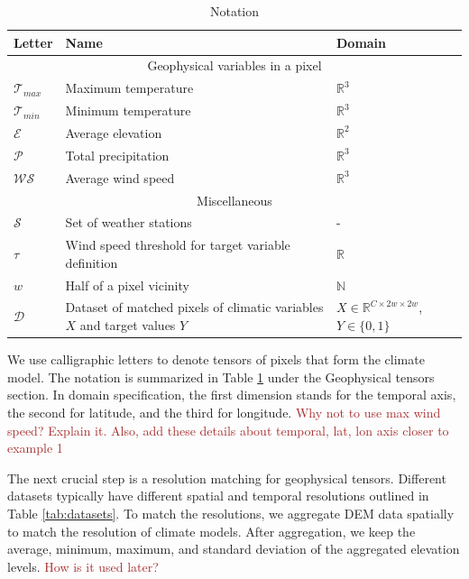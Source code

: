 \documentclass{article}
\begin{document}
\begin{table}[!b]
    \centering
    \begin{tabular}{p{0.7cm}|p{4.1cm}|p{2.5cm}}%
        \toprule
        Letter & Name & Domain  \\
        \midrule
        \multicolumn{3}{c}{Geophysical variables in a pixel} 
        \\
        \midrule
        $\mathcal{T}_{max}$ & Maximum temperature & $\mathbb{R}^3$   \\
        \midrule
        $\mathcal{T}_{min}$ & Minimum temperature & $\mathbb{R}^3$   \\
        \midrule
        $\mathcal{E}$ & Average elevation & $\mathbb{R}^2$   \\
        \midrule
        $\mathcal{P}$ & Total precipitation & $\mathbb{R}^3$   \\
        \midrule
        $\mathcal{WS}$ & Average wind speed & $\mathbb{R}^3$   \\
        \midrule
        \multicolumn{3}{c}{Miscellaneous}
        \\
        \midrule
        $\mathcal{S}$ & Set of weather stations & -
        \\
        \midrule
        $\tau$ & Wind speed threshold for target variable definition & $\mathbb{R}$ \\
        \midrule
        $w$ & Half of a pixel vicinity & $\mathbb{N}$
        \\
        \midrule
        $\mathcal{D}$ & Dataset of matched pixels of climatic variables $X$ and target values $Y$ &  
        $X\in\mathbb{R}^{C \times 2w \times 2w}$,
        $Y \in \{0, 1\}$
        \\
        \bottomrule
    \end{tabular}
    \caption{Notation}
    \label{tab:table_of_notations}
\end{table}

We use calligraphic letters to denote tensors of pixels that form the climate model. The notation is summarized in Table \ref{tab:table_of_notations} under the Geophysical tensors section. In domain specification, the first dimension stands for the temporal axis, the second for latitude, and the third for longitude.  \textcolor{brown}{Why not to use max wind speed? Explain it. Also, add these details about temporal, lat, lon axis closer to example 1} 

The next crucial step is a resolution matching for geophysical tensors. Different datasets typically have different spatial and temporal resolutions outlined in Table \ref{tab:datasets}. To match the resolutions, we aggregate DEM data spatially to match the resolution of climate models. After aggregation, we keep the average, minimum, maximum, and standard deviation of the aggregated elevation levels. \textcolor{brown}{How is it used later?}
\end{document}
